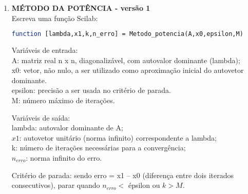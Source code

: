 \documentclass[leqno]{article}
\numberwithin{equation}{section}
\begin{document}
	\begin{enumerate}
		
		
		\item  \textbf{{\large MÉTODO DA POTÊNCIA - versão 1}}\\
		
		Escreva uma função Scilab:		
		\begin{lstlisting}[language=Scilab]
function [lambda,x1,k,n_erro] = Metodo_potencia(A,x0,epsilon,M)
		\end{lstlisting}
		
		\begin{tcolorbox}[colback=green!5,colframe=green!40!black]
		Variáveis de entrada:\\
		A: matriz real n x n, diagonalizável, com autovalor dominante (lambda);\\
		x0: vetor, não nulo, a ser utilizado como aproximação inicial do autovetor dominante.\\
		epsilon: precisão a ser usada no critério de parada.\\
		M: número máximo de iterações.\\
		\end{tcolorbox}
	
		\begin{tcolorbox}[colback=red!5,colframe=red!40!black]
		Variáveis de saída:\\
		lambda: autovalor dominante de A;\\
		$x1$: autovetor unitário (norma infinito) correspondente a lambda;\\
		k: número de iterações necessárias para a convergência;\\
		$n_{erro}$: norma infinito do erro.\\
		\end{tcolorbox}
	
		Critério de parada: sendo erro = x1 – x0 (diferença entre dois iterados consecutivos),
		parar quando $n_{erro} <$ épsilon ou $k > M$.
		
		
		

\end{enumerate}
\end{document}
